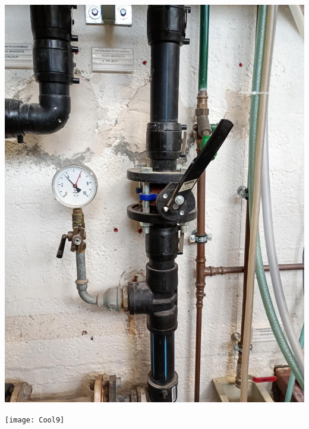 \documentclass[fleqn,a4paper,20pt]{article}
\begin{document}
\begin{minipage}{.5\textwidth}
\begin{minipage}{.49\textwidth}
		\captionsetup{width=.2\textwidth}
		\label{Cool4}
	\end{minipage}
	\begin{minipage}{.49\textwidth}
		\centering
		\includegraphics[width=0.95\linewidth]{Cool5}
		\label{Cool5}
	\end{minipage}
\end{minipage}
\begin{minipage}{.5\textwidth}
	\centering
	\texttt{[image: Cool9]}
	\label{Cool9}
	\vspace*{0.9cm}
\end{minipage}



\vspace*{0.5cm}


\begin{minipage}{.5\textwidth}



\end{minipage}
\end{document}
